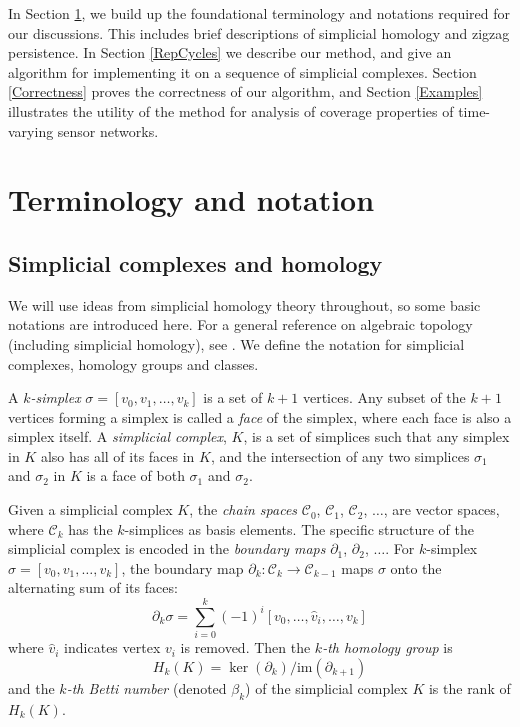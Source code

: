\documentclass[12pt]{article}
\begin{document}
In Section \ref{Notation}, we build up the foundational terminology and notations required for our discussions. This includes brief descriptions of simplicial homology and zigzag persistence. In Section \ref{RepCycles} we describe our method, and give an algorithm for implementing it on a sequence of simplicial complexes. Section \ref{Correctness} proves the correctness of our algorithm, and Section \ref{Examples} illustrates the utility of the method for analysis of coverage properties of time-varying sensor networks.

\section{Terminology and notation}\label{Notation}

\subsection{Simplicial complexes and homology}

We will use ideas from simplicial homology theory throughout, so some basic notations are introduced here. For a general reference on algebraic topology (including simplicial homology), see \cite{hatcher2001}. We define the notation for simplicial complexes, homology groups and classes.

A \textit{$k$-simplex} $\sigma = [v_0, v_1, \ldots, v_k]$ is a set of $k+1$ vertices. Any subset of the $k+1$ vertices forming a simplex is called a \textit{face} of the simplex, where each face is also a simplex itself. A \textit{simplicial complex}, $K$, is a set of simplices such that any simplex in $K$ also has all of its faces in $K$, and the intersection of any two simplices $\sigma_1$ and $\sigma_2$ in $K$ is a face of both $\sigma_1$ and $\sigma_2$.

Given a simplicial complex $K$, the \textit{chain spaces} $\mathcal{C}_0$, $\mathcal{C}_1$, $\mathcal{C}_2$, $\ldots$, are vector spaces, where $\mathcal{C}_k$ has the $k$-simplices as basis elements. The specific structure of the simplicial complex is encoded in the \textit{boundary maps} $\partial_1$, $\partial_2$, $\ldots$. For $k$-simplex $\sigma = [v_0, v_1, \ldots, v_k]$, the boundary map $\partial_k: \mathcal{C}_k \rightarrow \mathcal{C}_{k-1}$ maps $\sigma$ onto the alternating sum of its faces:
\[ \partial_k \sigma = \sum_{i=0}^k (-1)^i[v_0, \ldots, \hat{v}_i, \ldots, v_k] \]
where $\hat{v}_i$ indicates vertex $v_i$ is removed. Then the \textit{$k$-th homology group} is
\[ H_k(K) = \ker(\partial_k)/\mbox{im}(\partial_{k+1}) \]
and the \textit{$k$-th Betti number} (denoted $\beta_k$) of the simplicial complex $K$ is the rank of $H_k(K)$.
\end{document}
